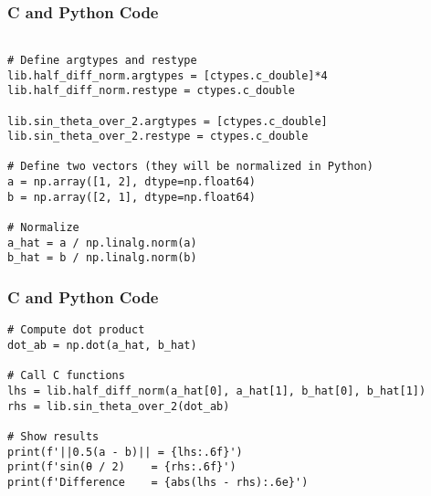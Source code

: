\documentclass{beamer}
\begin{document}
\begin{frame}[fragile]
\frametitle{C and Python Code}
    \begin{lstlisting}
        
# Define argtypes and restype
lib.half_diff_norm.argtypes = [ctypes.c_double]*4
lib.half_diff_norm.restype = ctypes.c_double

lib.sin_theta_over_2.argtypes = [ctypes.c_double]
lib.sin_theta_over_2.restype = ctypes.c_double

# Define two vectors (they will be normalized in Python)
a = np.array([1, 2], dtype=np.float64)
b = np.array([2, 1], dtype=np.float64)

# Normalize
a_hat = a / np.linalg.norm(a)
b_hat = b / np.linalg.norm(b)

    \end{lstlisting}
\end{frame}
\begin{frame}[fragile]
\frametitle{C and Python Code}
    \begin{lstlisting}
# Compute dot product
dot_ab = np.dot(a_hat, b_hat)

# Call C functions
lhs = lib.half_diff_norm(a_hat[0], a_hat[1], b_hat[0], b_hat[1])
rhs = lib.sin_theta_over_2(dot_ab)

# Show results
print(f'||0.5(a - b)|| = {lhs:.6f}')
print(f'sin(θ / 2)    = {rhs:.6f}')
print(f'Difference    = {abs(lhs - rhs):.6e}')

\end{lstlisting}
\end{frame}
\end{document}
